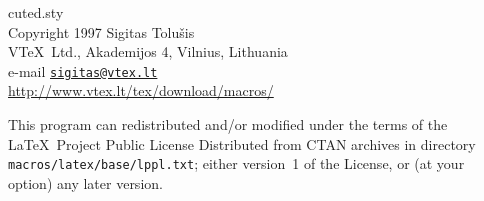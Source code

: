 \documentclass[DIV=8, pagesize=auto]{scrartcl}
\newcommand*{\mail}[1]{\href{mailto:#1}{\texttt{#1}}}
\newcommand*{\pkg}[1]{\textsf{#1}}
\begin{document}
\bigskip

\footnotesize
\noindent
\pkg{cuted.sty}\\
Copyright 1997 Sigitas Tolušis\\
V\TeX\ Ltd., Akademijos 4, Vilnius, Lithuania\\
e-mail \mail{sigitas@vtex.lt}\\
\url{http://www.vtex.lt/tex/download/macros/}

This program can redistributed and/or modified under the terms
of the \LaTeX\ Project Public License Distributed from CTAN
archives in directory \texttt{macros/latex/base/lppl.txt}; either
version~1 of the License, or (at your option) any later version.
\end{document}
